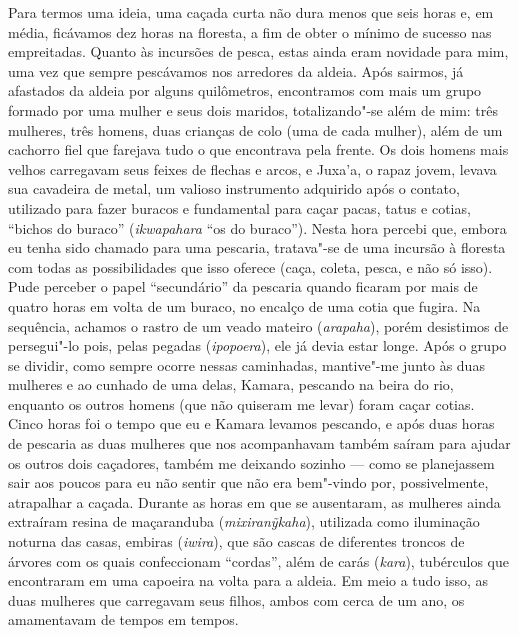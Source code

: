 Para termos uma ideia, uma caçada curta não dura menos que seis horas e,
em média, ficávamos dez horas na floresta, a fim de obter o mínimo de
sucesso nas empreitadas. Quanto às incursões de pesca, estas ainda eram
novidade para mim, uma vez que sempre pescávamos nos arredores da
aldeia. Após sairmos, já afastados da aldeia por alguns quilômetros,
encontramos com mais um grupo formado por uma mulher e seus dois
maridos, totalizando"-se além de mim: três mulheres, três homens, duas
crianças de colo (uma de cada mulher), além de um cachorro fiel que
farejava tudo o que encontrava pela frente. Os dois homens mais velhos
carregavam seus feixes de flechas e arcos, e Juxa'a, o rapaz jovem,
levava sua cavadeira de metal, um valioso instrumento adquirido após o
contato, utilizado para fazer buracos e fundamental para caçar pacas,
tatus e cotias, ``bichos do buraco'' (\emph{ikwapahara} ``os do buraco'').
Nesta hora percebi que, embora eu tenha sido chamado para uma pescaria,
tratava"-se de uma incursão à floresta com todas as possibilidades que
isso oferece (caça, coleta, pesca, e não só isso). Pude perceber o papel
``secundário'' da pescaria quando ficaram por mais de quatro horas em
volta de um buraco, no encalço de uma cotia que fugira. Na sequência,
achamos o rastro de um veado mateiro (\emph{arapaha}), porém desistimos
de persegui"-lo pois, pelas pegadas (\emph{ipopoera}), ele já devia estar
longe. Após o grupo se dividir, como sempre ocorre nessas caminhadas,
mantive"-me junto às duas mulheres e ao cunhado de uma delas, Kamara,
pescando na beira do rio, enquanto os outros homens (que não quiseram me
levar) foram caçar cotias. Cinco horas foi o tempo que eu e Kamara
levamos pescando, e após duas horas de pescaria as duas mulheres que nos
acompanhavam também saíram para ajudar os outros dois caçadores, também
me deixando sozinho --- como se planejassem sair aos poucos para eu não
sentir que não era bem"-vindo por, possivelmente, atrapalhar a caçada.
Durante as horas em que se ausentaram, as mulheres ainda extraíram
resina de maçaranduba (\emph{mixiranỹkaha}), utilizada como iluminação
noturna das casas, embiras (\emph{iwira}), que são cascas de diferentes
troncos de árvores com os quais confeccionam ``cordas'', além de carás
(\emph{kara}), tubérculos que encontraram em uma capoeira na volta para
a aldeia. Em meio a tudo isso, as duas mulheres que carregavam seus
filhos, ambos com cerca de um ano, os amamentavam de tempos em tempos.

